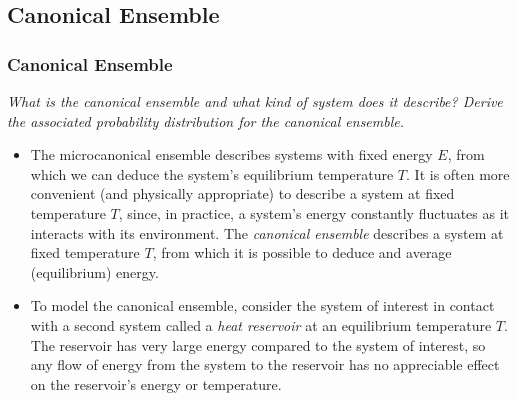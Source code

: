\documentclass[11pt, a4paper]{article}
\begin{document}
\subsection{Canonical Ensemble}

\subsubsection{Canonical Ensemble}
\textit{What is the canonical ensemble and what kind of system does it describe?  Derive the associated probability distribution for the canonical ensemble.}
\begin{itemize}
	\item The microcanonical ensemble describes systems with fixed energy $ E $, from which we can deduce the system's equilibrium temperature $ T $. It is often more convenient (and physically appropriate) to describe a system at fixed temperature $ T $, since, in practice, a system's energy constantly fluctuates as it interacts with its environment. The \textit{canonical ensemble} describes a system at fixed temperature $ T $, from which it is possible to deduce and average (equilibrium) energy.
	
	\item To model the canonical ensemble, consider the system of interest in contact with a second system called a \textit{heat reservoir} at an equilibrium temperature $ T $. The reservoir has very large energy compared to the system of interest, so any flow of energy from the system to the reservoir has no appreciable effect on the reservoir's energy or temperature. 
	

\end{itemize}
\end{document}
